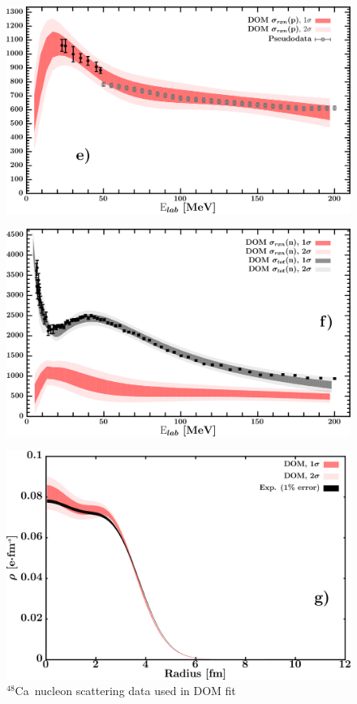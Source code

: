 \documentclass[twocolumn,secnumarabic,amssymb, nobibnotes, aps, prl,
superscriptaddress, nobalancelastpage]{revtex4}
\newcommand{\caEight}{\ensuremath{^{48}}C\lowercase{a}}
\begin{document}
\begin{figure}[!htb]
\begin{minipage}{0.4\linewidth}
        \includegraphics[width=\linewidth]{figures/ca48_protonInelastic.png}
        \label{DOM_ca48_proton_inelastic}
    \end{minipage}\hspace{6pt}
    \begin{minipage}{0.4\linewidth}
        \centering
        \includegraphics[width=\linewidth]{figures/ca48_neutronInelastic.png}
        \label{DOM_ca48_neutron_inelastic}
    \end{minipage}
    \caption{\caEight\ nucleon scattering data used in DOM fit}
    \label{DOM_ca48_scattering}
    \centering
    \begin{minipage}{0.4\linewidth}
        \centering
        \includegraphics[width=\linewidth]{figures/ca48_chargeDensity.png}

\end{minipage}
\end{figure}
\end{document}
